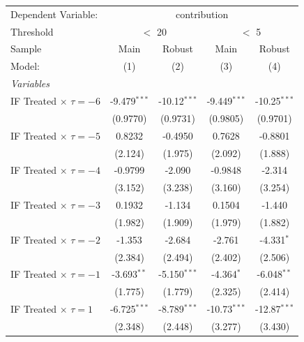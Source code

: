 
\begingroup
\centering
\begin{tabular}{lcccc}
   \tabularnewline \midrule \midrule
   Dependent Variable: & \multicolumn{4}{c}{contribution}\\
   Threshold & \multicolumn{2}{c}{$<$ 20} & \multicolumn{2}{c}{$<$ 5} \\ 
   Sample                            & Main           & Robust         & Main           & Robust \\   
   Model:                            & (1)            & (2)            & (3)            & (4)\\  
   \midrule
   \emph{Variables}\\
   IF Treated $\times$ $\tau = -6$   & -9.479$^{***}$ & -10.12$^{***}$ & -9.449$^{***}$ & -10.25$^{***}$\\   
                                     & (0.9770)       & (0.9731)       & (0.9805)       & (0.9701)\\   
   IF Treated $\times$ $\tau = -5$   & 0.8232         & -0.4950        & 0.7628         & -0.8801\\   
                                     & (2.124)        & (1.975)        & (2.092)        & (1.888)\\   
   IF Treated $\times$ $\tau = -4$   & -0.9799        & -2.090         & -0.9848        & -2.314\\   
                                     & (3.152)        & (3.238)        & (3.160)        & (3.254)\\   
   IF Treated $\times$ $\tau = -3$   & 0.1932         & -1.134         & 0.1504         & -1.440\\   
                                     & (1.982)        & (1.909)        & (1.979)        & (1.882)\\   
   IF Treated $\times$ $\tau = -2$   & -1.353         & -2.684         & -2.761         & -4.331$^{*}$\\   
                                     & (2.384)        & (2.494)        & (2.402)        & (2.506)\\   
   IF Treated $\times$ $\tau = -1$   & -3.693$^{**}$  & -5.150$^{***}$ & -4.364$^{*}$   & -6.048$^{**}$\\   
                                     & (1.775)        & (1.779)        & (2.325)        & (2.414)\\   
   IF Treated $\times$ $\tau = 1$    & -6.725$^{***}$ & -8.789$^{***}$ & -10.73$^{***}$ & -12.87$^{***}$\\   
                                     & (2.348)        & (2.448)        & (3.277)        & (3.430)\\   

\end{tabular}
